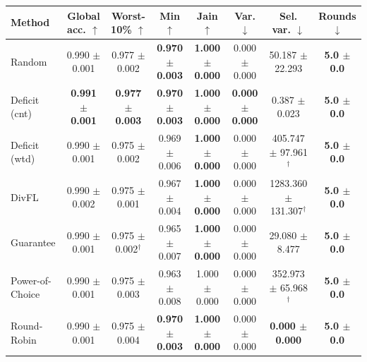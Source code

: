 \begin{tabular}{lccccccc}
\toprule
Method & Global acc. $\uparrow$ & Worst-10\% $\uparrow$ & Min $\uparrow$ & Jain $\uparrow$ & Var. $\downarrow$ & Sel. var. $\downarrow$ & Rounds $\downarrow$ \\
\midrule
Random & 0.990 $\pm$ 0.001 & 0.977 $\pm$ 0.002 & \textbf{0.970 $\pm$ 0.003} & \textbf{1.000 $\pm$ 0.000} & 0.000 $\pm$ 0.000 & 50.187 $\pm$ 22.293 & \textbf{5.0 $\pm$ 0.0} \\
Deficit (cnt) & \textbf{0.991 $\pm$ 0.001} & \textbf{0.977 $\pm$ 0.003} & \textbf{0.970 $\pm$ 0.003} & \textbf{1.000 $\pm$ 0.000} & \textbf{0.000 $\pm$ 0.000} & 0.387 $\pm$ 0.023 & \textbf{5.0 $\pm$ 0.0} \\
Deficit (wtd) & 0.990 $\pm$ 0.001 & 0.975 $\pm$ 0.002 & 0.969 $\pm$ 0.006 & \textbf{1.000 $\pm$ 0.000} & 0.000 $\pm$ 0.000 & 405.747 $\pm$ 97.961$^\dagger$ & \textbf{5.0 $\pm$ 0.0} \\
DivFL & 0.990 $\pm$ 0.002 & 0.975 $\pm$ 0.001 & 0.967 $\pm$ 0.004 & \textbf{1.000 $\pm$ 0.000} & 0.000 $\pm$ 0.000 & 1283.360 $\pm$ 131.307$^\dagger$ & \textbf{5.0 $\pm$ 0.0} \\
Guarantee & 0.990 $\pm$ 0.001 & 0.975 $\pm$ 0.002$^\dagger$ & 0.965 $\pm$ 0.007 & \textbf{1.000 $\pm$ 0.000} & 0.000 $\pm$ 0.000 & 29.080 $\pm$ 8.477 & \textbf{5.0 $\pm$ 0.0} \\
Power-of-Choice & 0.990 $\pm$ 0.001 & 0.975 $\pm$ 0.003 & 0.963 $\pm$ 0.008 & 1.000 $\pm$ 0.000 & 0.000 $\pm$ 0.000 & 352.973 $\pm$ 65.968$^\dagger$ & \textbf{5.0 $\pm$ 0.0} \\
Round-Robin & 0.990 $\pm$ 0.001 & 0.975 $\pm$ 0.004 & \textbf{0.970 $\pm$ 0.003} & \textbf{1.000 $\pm$ 0.000} & 0.000 $\pm$ 0.000 & \textbf{0.000 $\pm$ 0.000} & \textbf{5.0 $\pm$ 0.0} \\
\bottomrule
\end{tabular}
